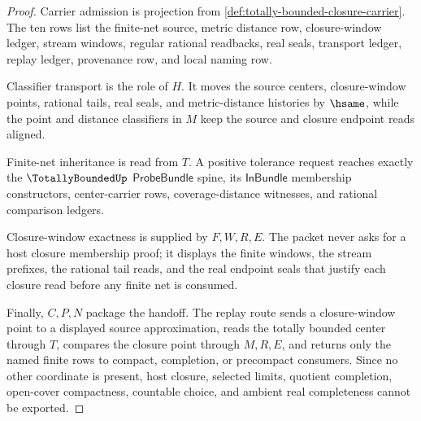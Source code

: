 \begin{proof}
Carrier admission is projection from \autoref{def:totally-bounded-closure-carrier}. The ten rows list the finite-net source, metric distance row, closure-window ledger, stream windows, regular rational readbacks, real seals, transport ledger, replay ledger, provenance row, and local naming row.

Classifier transport is the role of $H$. It moves the source centers, closure-window points, rational tails, real seals, and metric-distance histories by $\hsame$, while the point and distance classifiers in $M$ keep the source and closure endpoint reads aligned.

Finite-net inheritance is read from $T$. A positive tolerance request reaches exactly the $\TotallyBoundedUp$ $\mathsf{ProbeBundle}$ spine, its $\mathsf{InBundle}$ membership constructors, center-carrier rows, coverage-distance witnesses, and rational comparison ledgers.

Closure-window exactness is supplied by $F,W,R,E$. The packet never asks for a host closure membership proof; it displays the finite windows, the stream prefixes, the rational tail reads, and the real endpoint seals that justify each closure read before any finite net is consumed.

Finally, $C,P,N$ package the handoff. The replay route sends a closure-window point to a displayed source approximation, reads the totally bounded center through $T$, compares the closure point through $M,R,E$, and returns only the named finite rows to compact, completion, or precompact consumers. Since no other coordinate is present, host closure, selected limits, quotient completion, open-cover compactness, countable choice, and ambient real completeness cannot be exported.
\end{proof}

